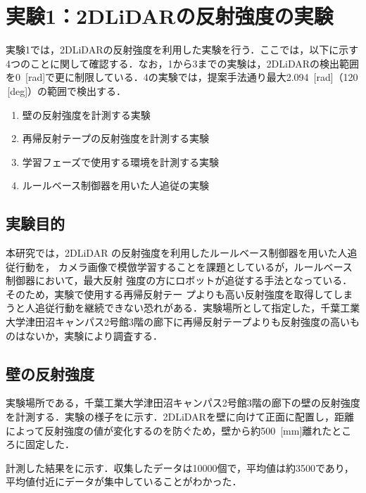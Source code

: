 
\section{実験1：2DLiDARの反射強度の実験}

  実験1では，2DLiDARの反射強度を利用した実験を行う．ここでは，以下に示す4つのことに関して確認する．なお，1から3までの実験は，2DLiDARの検出範囲を0 \,[rad]で更に制限している．4の実験では，提案手法通り最大2.094 \,[rad]（120 \,[deg]）の範囲で検出する．

  \begin{enumerate}
    \item 壁の反射強度を計測する実験
    \item 再帰反射テープの反射強度を計測する実験
    \item 学習フェーズで使用する環境を計測する実験
    \item ルールベース制御器を用いた人追従の実験
  \end{enumerate}

\subsection{実験目的}

本研究では，2DLiDAR の反射強度を利用したルールベース制御器を用いた人追従行動を，
カメラ画像で模倣学習することを課題としているが，ルールベース制御器において，最大反射
強度の方にロボットが追従する手法となっている．そのため，実験で使用する再帰反射テー
プよりも高い反射強度を取得してしまうと人追従行動を継続できない恐れがある．実験場所として指定した，千葉工業大学津田沼キャンパス2号館3階の廊下に再帰反射テープよりも反射強度の高いものはないか，実験により調査する．

\newpage

\subsection{壁の反射強度}

  実験場所である，千葉工業大学津田沼キャンパス2号館3階の廊下の壁の反射強度を計測する．実験の様子をに示す．2DLiDARを壁に向けて正面に配置し，距離によって反射強度の値が変化するのを防ぐため，壁から約500 \,[mm]離れたところに固定した．
  
  計測した結果をに示す．収集したデータは10000個で，平均値は約3500であり，平均値付近にデータが集中していることがわかった．

